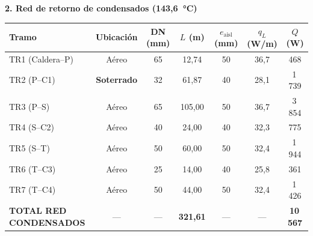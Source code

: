 \documentclass[12pt]{article}
\begin{document}
\begin{landscape}
\begin{table}[H]
		\vspace{0.5cm}

		\begin{minipage}{\linewidth}
			\begin{center}
				\textbf{2. Red de retorno de condensados (143{,}6~°C)}
			\end{center}
			\vspace{0.1cm}
			\centering
			\begin{tabular}{lcccccc}
				\toprule
				\textbf{Tramo}                 & \textbf{Ubicación} & \textbf{DN (mm)} & \textbf{$L$ (m)}  & \textbf{$e_{\text{aisl}}$ (mm)} & \textbf{$q_L$ (W/m)} & \textbf{$Q$ (W)} \\
				\midrule
				TR1 (Caldera--P)               & Aéreo              & 65               & 12{,}74           & 50                              & 36{,}7               & 468              \\
				TR2 (P--C1)                    & \textbf{Soterrado} & 32               & 61{,}87           & 40                              & 28{,}1               & 1\,739           \\
				TR3 (P--S)                     & Aéreo              & 65               & 105{,}00          & 50                              & 36{,}7               & 3\,854           \\
				TR4 (S--C2)                 & Aéreo              & 40               & 24{,}00           & 40                              & 32{,}3               & 775              \\
				TR5 (S--T)                     & Aéreo              & 50               & 60{,}00           & 50                              & 32{,}4               & 1\,944           \\
				TR6 (T--C3)                 & Aéreo              & 25               & 14{,}00           & 40                              & 25{,}8               & 361              \\
				TR7 (T--C4)                 & Aéreo              & 50               & 44{,}00           & 50                              & 32{,}4               & 1\,426           \\
				\midrule
				\textbf{TOTAL RED CONDENSADOS} & ---                & ---              & \textbf{321{,}61} & ---                             & ---                  & \textbf{10\,567} \\
				\bottomrule
			\end{tabular}
			\label{tab:resumen_cond_completo}
		\end{minipage}
	\end{table}
\end{landscape}
\end{document}

